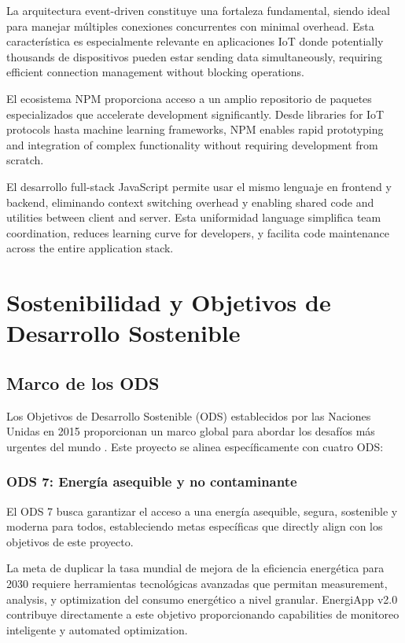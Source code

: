 La arquitectura event-driven constituye una fortaleza fundamental, siendo ideal para manejar múltiples conexiones concurrentes con minimal overhead. Esta característica es especialmente relevante en aplicaciones IoT donde potentially thousands de dispositivos pueden estar sending data simultaneously, requiring efficient connection management without blocking operations.

El ecosistema NPM proporciona acceso a un amplio repositorio de paquetes especializados que accelerate development significantly. Desde libraries for IoT protocols hasta machine learning frameworks, NPM enables rapid prototyping and integration of complex functionality without requiring development from scratch.

El desarrollo full-stack JavaScript permite usar el mismo lenguaje en frontend y backend, eliminando context switching overhead y enabling shared code and utilities between client and server. Esta uniformidad language simplifica team coordination, reduces learning curve for developers, y facilita code maintenance across the entire application stack.

\section{Sostenibilidad y Objetivos de Desarrollo Sostenible}

\subsection{Marco de los ODS}

Los Objetivos de Desarrollo Sostenible (ODS) establecidos por las Naciones Unidas en 2015 proporcionan un marco global para abordar los desafíos más urgentes del mundo \cite{un2015transforming}. Este proyecto se alinea específicamente con cuatro ODS:

\subsubsection{ODS 7: Energía asequible y no contaminante}

El ODS 7 busca garantizar el acceso a una energía asequible, segura, sostenible y moderna para todos, estableciendo metas específicas que directly align con los objetivos de este proyecto.

La meta de duplicar la tasa mundial de mejora de la eficiencia energética para 2030 requiere herramientas tecnológicas avanzadas que permitan measurement, analysis, y optimization del consumo energético a nivel granular. EnergiApp v2.0 contribuye directamente a este objetivo proporcionando capabilities de monitoreo inteligente y automated optimization.

